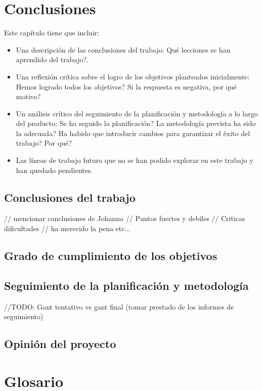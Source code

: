 \documentclass[11pt,a4paper]{article}
\begin{document}
\section{Conclusiones}
\bigskip 

Este capítulo tiene que incluir:
\begin{itemize}
\item Una descripción de las conclusiones del trabajo: Qué lecciones se han aprendido del trabajo?.
\item Una reflexión crítica sobre el logro de los objetivos planteados inicialmente: Hemos logrado todos los objetivos? Si la respuesta es negativa, por qué motivo? 
\item Un análisis crítico del seguimiento de la planificación y metodología a lo largo del producto: Se ha seguido la planificación? La metodología prevista ha sido la adecuada? Ha habido que introducir cambios para garantizar el éxito del trabajo? Por qué? 
\item Las líneas de trabajo futuro que no se han podido explorar en este trabajo y han quedado pendientes.
\end{itemize}

\subsection{Conclusiones del trabajo}
// mencionar conclusiones de Johanna
// Puntos fuertes y debiles
// Criticas dificultades
// ha merecido la pena etc...
\medskip 

\subsection{Grado de cumplimiento de los objetivos}
\medskip 

\subsection{Seguimiento de la planificación y metodología}\label{sec:seguiminetoPlanificacion}
//TODO: Gant tentativo vs gant final (tomar prestado de los informes de seguimiento)
\medskip 

\subsection{Opinión del proyecto}
\newpage 


\section{Glosario}
\bigskip
\end{document}
